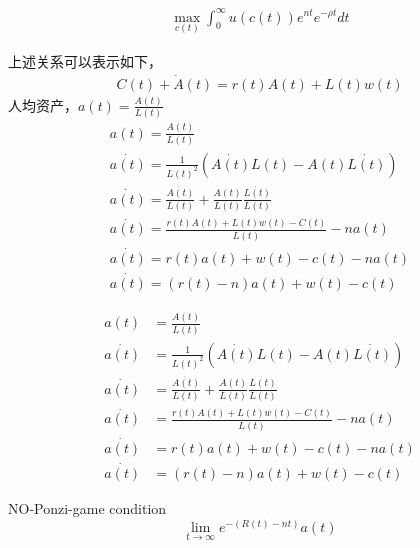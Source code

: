 \begin{gather}
\max_{c(t)}\int_{0}^{\infty}u(c(t))e^{nt}e^{-\rho t}dt
\label{1.1}
\end{gather}

上述关系可以表示如下，
\begin{gather}
	C(t)+\dot{A}(t)=r(t)A(t)+L(t)w(t)
\end{gather}
人均资产，$ a(t) =\frac{A(t)}{L(t)}$
\begin{equation}\label{eqn:3}
\begin{split}
a(t) =\frac{A(t)}{L(t)}\\
\dot{a(t)}=\frac{1}{L(t)^2}(\dot{A(t)}L(t)-A(t)\dot{L(t)})\\
\dot{a(t)}=\frac{\dot{A(t)}}{L(t)}+\frac{A(t)}{L(t)}\frac{\dot{L(t)}}{L(t)}\\
\dot{a(t)}=\frac{r(t)A(t)+L(t)w(t)-C(t)}{L(t)}-na(t)\\
\dot{a(t)}	=r(t)a(t)+w(t)-c(t)-na(t)\\
\dot{a(t)}=(r(t)-n)a(t)+w(t)-c(t)
\end{split}
\end{equation}


\begin{equation}
\begin{split}
a(t) &=\frac{A(t)}{L(t)}\\
\dot{a(t)}&=\frac{1}{L(t)^2}(\dot{A(t)}L(t)-A(t)\dot{L(t)})\\
\dot{a(t)}&=\frac{\dot{A(t)}}{L(t)}+\frac{A(t)}{L(t)}\frac{\dot{L(t)}}{L(t)}\\
\dot{a(t)}&=\frac{r(t)A(t)+L(t)w(t)-C(t)}{L(t)}-na(t)\\
\dot{a(t)}	&=r(t)a(t)+w(t)-c(t)-na(t)\\
\dot{a(t)}&=(r(t)-n)a(t)+w(t)-c(t)
\end{split}
\end{equation}

NO-Ponzi-game condition
\begin{equation}
\lim\limits_{t\to \infty}e^{-(R(t)-nt)}	a(t)
\end{equation}


